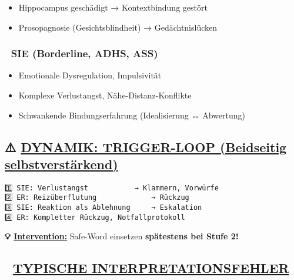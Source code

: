 \begin{itemize}
\tightlist
\item
  Hippocampus geschädigt → Kontextbindung gestört
\item
  Prosopagnosie (Gesichtsblindheit) → Gedächtnislücken
\end{itemize}

\hypertarget{sie-borderline-adhs-ass}{%
\subsubsection{\texorpdfstring{🔴 \textbf{SIE (Borderline, ADHS, ASS)}}{🔴 SIE (Borderline, ADHS, ASS)}}\label{sie-borderline-adhs-ass}}

\begin{itemize}
\tightlist
\item
  Emotionale Dysregulation, Impulsivität
\item
  Komplexe Verlustangst, Nähe-Distanz-Konflikte
\item
  Schwankende Bindungserfahrung (Idealisierung ↔ Abwertung)
\end{itemize}

\hypertarget{dynamik-trigger-loop-beidseitig-selbstverstuxe4rkend}{%
\subsection{\texorpdfstring{⚠️ \textbf{\ul{DYNAMIK: TRIGGER-LOOP (Beidseitig selbstverstärkend)}}}{⚠️ DYNAMIK: TRIGGER-LOOP (Beidseitig selbstverstärkend)}}\label{dynamik-trigger-loop-beidseitig-selbstverstuxe4rkend}}

\begin{verbatim}
1️⃣ SIE: Verlustangst 			→ Klammern, Vorwürfe
2️⃣ ER: Reizüberflutung 			→ Rückzug
3️⃣ SIE: Reaktion als Ablehnung 	→ Eskalation
4️⃣ ER: Kompletter Rückzug, Notfallprotokoll
\end{verbatim}

\textbf{💡 \ul{Intervention:}} Safe-Word einsetzen \textbf{spätestens bei Stufe 2!}

\hypertarget{typische-interpretationsfehler}{%
\subsection{\texorpdfstring{🧠 \textbf{\ul{TYPISCHE INTERPRETATIONSFEHLER}}}{🧠 TYPISCHE INTERPRETATIONSFEHLER}}\label{typische-interpretationsfehler}}

